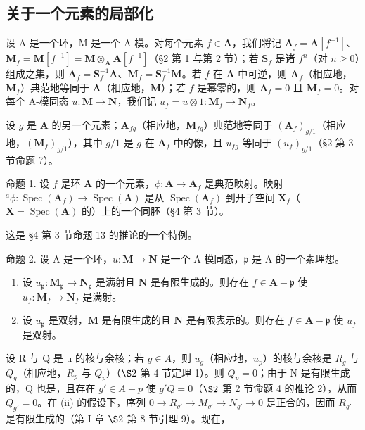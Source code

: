 \subsection{关于一个元素的局部化}

设 A 是一个环，M 是一个 A-模。对每个元素 \(f \in \mathbf{A}\)，我们将记 \(\mathbf{A}_f = \mathbf{A}[f^{-1}]\)、\(\mathbf{M}_f = \mathbf{M}[f^{-1}] = \mathbf{M} \otimes_{\mathbf{A}} \mathbf{A}[f^{-1}]\)（§2 第 1 与第 2 节）；若 \(\mathbf{S}_f\) 是诸 \(f^n\)（对 \(n \geqslant 0\)）组成之集，则 \(\mathbf{A}_f = \mathbf{S}_f^{-1}\mathbf{A}\)、\(\mathbf{M}_f = \mathbf{S}_f^{-1}\mathbf{M}\)。若 \(f\) 在 \(\mathbf{A}\) 中可逆，则 \(\mathbf{A}_f\)（相应地，\(\mathbf{M}_f\)）典范地等同于 \(\mathbf{A}\)（相应地，\(\mathbf{M}\)）；若 \(f\) 是幂零的，则 \(\mathbf{A}_f = 0\) 且 \(\mathbf{M}_f = 0\)。对每个 A-模同态 \(u: \mathbf{M} \to \mathbf{N}\)，我们记 \(u_f = u \otimes 1: \mathbf{M}_f \to \mathbf{N}_f\)。

设 \(g\) 是 \(\mathbf{A}\) 的另一个元素；\(\mathbf{A}_{fg}\)（相应地，\(\mathbf{M}_{fg}\)）典范地等同于 \((\mathbf{A}_f)_{g/1}\)（相应地，\((\mathbf{M}_f)_{g/1}\)），其中 \(g/1\) 是 \(g\) 在 \(\mathbf{A}_f\) 中的像，且 \(u_{fg}\) 等同于 \((u_f)_{g/1}\)（§2 第 3 节命题 7）。

命题 1. 设 \(f\) 是环 \(\mathbf{A}\) 的一个元素，\(\phi: \mathbf{A} \to \mathbf{A}_f\) 是典范映射。映射 \(^a\phi: \operatorname{Spec}(\mathbf{A}_f) \to \operatorname{Spec}(\mathbf{A})\) 是从 \(\operatorname{Spec}(\mathbf{A}_f)\) 到开子空间 \(\mathbf{X}_f\)（\(\mathbf{X} = \operatorname{Spec}(\mathbf{A})\) 的）上的一个同胚（§4 第 3 节）。

这是 §4 第 3 节命题 13 的推论的一个特例。

命题 2. 设 A 是一个环，\(u: \mathbf{M} \to \mathbf{N}\) 是一个 A-模同态，\(\mathfrak{p}\) 是 A 的一个素理想。

\begin{enumerate}
\def\labelenumi{(\roman{enumi})}
\item
  设 \(u_{\mathfrak{p}} \colon \mathbf{M}_{\mathfrak{p}} \to \mathbf{N}_{\mathfrak{p}}\) 是满射且 \(\mathbf{N}\) 是有限生成的。则存在 \(f \in \mathbf{A} - \mathfrak{p}\) 使 \(u_{f} \colon \mathbf{M}_{f} \to \mathbf{N}_{f}\) 是满射。
\item
  设 \(u_{\mathfrak{p}}\) 是双射，\(\mathbf{M}\) 是有限生成的且 \(\mathbf{N}\) 是有限表示的。则存在 \(f \in \mathbf{A} - \mathfrak{p}\) 使 \(u_{f}\) 是双射。
\end{enumerate}

设 R 与 Q 是 u 的核与余核；若 \(g \in A\)，则 \(u_g\)（相应地，\(u_p\)）的核与余核是 \(R_g\) 与 \(Q_g\)（相应地，\(R_p\) 与 \(Q_p\)）（\(\S 2\) 第 4 节定理 1）。则 \(Q_p = 0\)；由于 N 是有限生成的，Q 也是，且存在 \(g' \in A - p\) 使 \(g'Q = 0\)（\(\S 2\) 第 2 节命题 4 的推论 2），从而 \(Q_{g'} = 0\)。在 (ii) 的假设下，序列 \(0 \to R_{g'} \to M_{g'} \to N_{g'} \to 0\) 是正合的，因而 \(R_{g'}\) 是有限生成的（第 I 章 \(\S 2\) 第 8 节引理 9）。现在，

